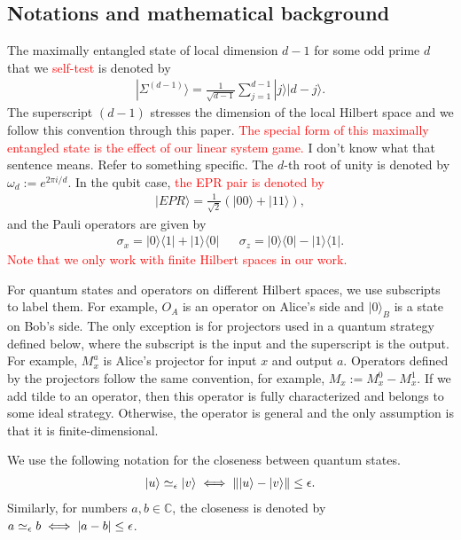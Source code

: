 \documentclass[11pt,letterpaper]{article}
\newcommand{\ket}[1]{|#1\rangle}
\newcommand{\ketbra}[2]{|#1\rangle\langle#2|}
\DeclarePairedDelimiter{\norm}{\lVert}{\rVert}
\DeclarePairedDelimiter{\cnorm}{\lvert}{\rvert}
\newcommand{\C}{\mathbb{C}}
\newcommand{\1}{\mathbb{1}}
\newcommand{\EPR}[1]{\Sigma^{(#1)}}
\newcommand{\paulix}{\sigma_x}
\newcommand{\pauliz}{\sigma_z}
\newcommand{\appd}[1]{\simeq_{#1}}
\def\carl#1{{\color{blue} #1}}
\newcommand{\hf}[1]{\textcolor{red}{#1}}
\theoremstyle{definition}
\begin{document}
\subsection{Notations and mathematical background}
The maximally entangled state of local dimension $d-1$ for some odd prime $d$ that we \hf{self-test} is denoted by
\begin{align}
\ket{\EPR{d-1}} = \frac{1}{\sqrt{d-1}} \sum_{j = 1}^{d-1} \ket{j}\ket{d-j}.
\end{align}
The superscript $(d-1)$ stresses the dimension of the local Hilbert space and we follow this convention through this paper.
\hf{The special form of this maximally entangled state is the effect of our linear system game.} \carl{I don't know what that sentence means.  Refer to something specific.}
The $d$-th root of unity is denoted by $\omega_d:=e^{2\pi i/d}$. In the qubit case, 
\hf{the EPR pair is denoted by} 
\begin{align}
	\ket{EPR} = \frac{1}{\sqrt{2}}(\ket{00} + \ket{11}),
\end{align}
and the Pauli operators are given by
\begin{align}
	\paulix = \ketbra{0}{1}+\ketbra{1}{0} && \pauliz = \ketbra{0}{0} - \ketbra{1}{1}.
\end{align}
\hf{Note that we only work with finite Hilbert spaces in our work.}

For quantum states and operators on different Hilbert spaces, we use subscripts to label them.
For example, $O_A$ is an operator on Alice's side and $\ket{0}_{B}$ is a state on Bob's side. 
The only exception is for projectors used in a quantum strategy defined below, where the subscript 
is the input and the superscript is the output. For example, $M_x^a$ is Alice's projector for input $x$ and output $a$.
Operators defined by the projectors follow the same convention, for example, $M_x := M_x^0 - M_x^1$.
If we add tilde to an operator, then this operator is fully characterized and belongs to some ideal strategy.
Otherwise, the operator is general and the only assumption is that it is finite-dimensional.

We use the following notation for the closeness between quantum states.
\begin{align}
	\ket{u} \appd{\epsilon} \ket{v} \iff \norm{\ket{u} - \ket{v}} \leq \epsilon. 
\end{align}
Similarly, for numbers $a,b \in \C$, the closeness is denoted by
$a \appd{\epsilon} b \iff \cnorm{a-b} \leq \epsilon$.
\end{document}
